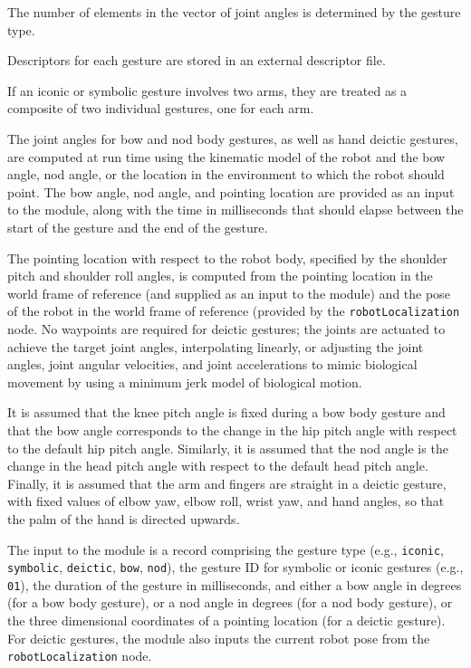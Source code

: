\documentclass{CSSRforAfrica}
\begin{document}
{The number of elements in the vector of joint angles is determined by the gesture type. 

Descriptors for each gesture are stored in an external descriptor file. 
 
If an iconic or symbolic gesture involves two arms, they are treated as a composite of two individual gestures, one for each arm.
 
The joint angles for bow and nod body gestures, as well as hand deictic gestures,  are computed at run time using the kinematic model of the robot and the bow angle, nod angle, or the location in the environment to which the robot should point.  
The bow angle, nod angle, and pointing location  are provided as an input to the module, along with the time  in milliseconds that should elapse between the start of the gesture and the end of the gesture. 

The pointing location  with respect to the robot body, specified by the shoulder pitch and shoulder roll angles, is computed from the pointing location in the world frame of reference (and supplied as an input to the module) and the pose of the robot in the world frame of reference (provided by the {\small \verb+robotLocalization+} node.   
No waypoints are required for deictic gestures; the joints are actuated to achieve the target joint angles, interpolating linearly, or adjusting the joint angles, joint angular velocities, and joint accelerations to mimic biological movement by using a minimum jerk model of biological motion. 

It is assumed that the knee pitch angle is fixed during a bow body gesture and that the bow angle corresponds to the change in the hip pitch angle with respect to the default hip pitch angle.   Similarly, it is assumed that the nod angle is the change in the head pitch angle with respect to the default head pitch angle.  Finally, it is assumed that the arm and fingers are  straight in a deictic gesture, with fixed values of elbow yaw, elbow roll,  wrist yaw, and hand angles, so that the palm of the hand is directed upwards.
 
The input to the module is a record comprising  the gesture type (e.g., {\small \verb+iconic+}, {\small \verb+symbolic+}, {\small \verb+deictic+}, {\small \verb+bow+}, {\small \verb+nod+}), the gesture ID for symbolic or iconic gestures (e.g., {\small \verb+01+}), the duration of the gesture in milliseconds, and either  a bow angle in degrees (for a bow body gesture), or a nod angle in degrees (for  a nod body gesture), or  the  three dimensional coordinates of a pointing location (for a deictic gesture).  For deictic gestures, the module also inputs the current robot pose from the {\small \verb+robotLocalization+} node. 

}
\end{document}
